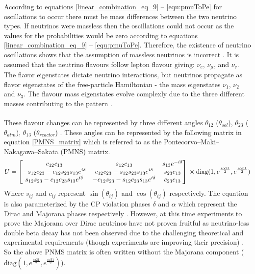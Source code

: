 According to equations \ref{linear_combination_eq_9} -- \ref{equ:pmuToPe} for oscillations to occur there must be mass differences between the two neutrino types. If neutrinos were massless then the oscillations could not occur as the values for the probabilities would be zero according to equations \ref{linear_combination_eq_9} -- \ref{equ:pmuToPe}. Therefore, the existence of neutrino oscillations shows that the assumption of massless neutrinos is incorrect \cite{griffiths2008neutrinoOscillations} \cite{sassaroli1999neutrino}. It is assumed that the neutrino flavours follow lepton flavour giving: $\nu_e$, $\nu_\mu$, and $\nu_\tau$. The flavor eigenstates dictate neutrino interactions, but neutrinos propagate as flavor eigenstates of the free-particle Hamiltonian - the mass eigenstates $\nu_1$, $\nu_2$ and $\nu_3$. The flavour mass eigenstates evolve complexly due to the three different masses contributing to the pattern   \cite{griffiths2008neutrinoOscillations}. 
\\\\These flavour changes can be represented by three different angles $\theta_{12}$ ($\theta_{sol}$), $\theta_{23}$ ($\theta_{atm}$), $\theta_{13}$ ($\theta_{reactor}$) \cite{Olive_2014}  \cite{griffiths2008neutrinoOscillations}. These angles can be represented by the following  matrix in equation \ref{PMNS_matrix} which is referred to as the Pontecorvo–Maki–Nakagawa–Sakata (PMNS) matrix.
\begin{equation}
U
    =
    \begin{bmatrix}
        c_{12}c_{13} & s_{12}c_{13} & s_{13}e^{-i\delta}\\
        -s_{12}c_{23} - c_{12}s_{23}s_{13}e^{i\delta} & c_{12}c_{23} - s_{12}s_{23}s_{13}e^{i\delta} & s_{23}c_{13} \\
        s_{12}s_{23} - c_{12}c_{23}s_{13}e^{i\delta} & -c_{12}s_{23} - s_{12}c_{23}s_{13}e^{i\delta} & c_{23}c_{13} 
    \end{bmatrix}
    \\ \times \text{diag}(1, e^{\frac{i\alpha21}{2}} , e^{\frac{i\alpha31}{2}})
    \label{PMNS_matrix}
\end{equation}
Where $s_{ij}$ and $c_{ij}$ represent $\sin(\theta_{ij})$ and $\cos(\theta_{ij})$ respectively. The equation is also parameterized by the CP violation phases $\delta$ and $\alpha$ which represent the Dirac and Majorana phases respectively \cite{Olive_2014}. However, at this time experiments to prove the Majorana over Dirac neutrinos have not proven fruitful as neutrino-less double beta decay has not been observed due to the challenging theoretical and experimental requirements (though experiments are improving their precision) \cite{Cardani_2019}.  So the above PNMS matrix is often written without the Majorana component ($\text{diag}(1, e^{\frac{i\alpha21}{2}} , e^{\frac{i\alpha31}{2}})$). 
